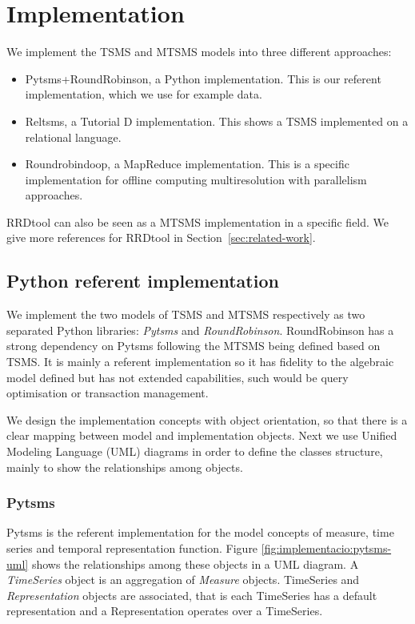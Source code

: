 
\section{Implementation}

\todo{}

We implement the TSMS and MTSMS models into three different approaches:

\begin{itemize}
\item Pytsms+RoundRobinson, a Python implementation. This is our referent
  implementation, which we use for example data.
\item Reltsms, a Tutorial D implementation. This shows a TSMS
  implemented on a relational language.
\item Roundrobindoop, a MapReduce implementation. This is a specific
  implementation for offline computing multiresolution with
  parallelism approaches.
\end{itemize}

RRDtool can also be seen as a MTSMS implementation in a specific
field. We give more references for RRDtool in
Section~\ref{sec:related-work}.



\subsection{Python referent implementation}

We implement the two models of TSMS and MTSMS respectively as two
separated Python libraries: \emph{Pytsms} and \emph{RoundRobinson}.
RoundRobinson has a strong dependency on Pytsms following the MTSMS
being defined based on TSMS.  It is mainly a referent implementation
so it has fidelity to the algebraic model defined but has not extended
 capabilities, such would be query optimisation or
transaction management.

We design the implementation concepts with object orientation, so that
there is a clear mapping between model and implementation
objects. Next we use Unified Modeling Language (UML) diagrams in order
to define the classes structure, mainly to show the relationships
among objects.


\subsubsection{Pytsms}

Pytsms is the referent implementation for the model concepts of
measure, time series and temporal representation function.  Figure
\ref{fig:implementacio:pytsms-uml} shows the relationships among these
objects in a UML diagram. A \emph{TimeSeries} object is an aggregation
of \emph{Measure} objects. TimeSeries and \emph{Representation}
objects are associated, that is each TimeSeries has a default
representation and a Representation operates over a TimeSeries.

